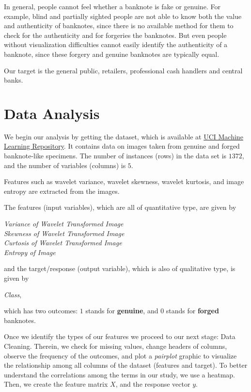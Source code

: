 \documentclass[a4paper,11pt]{amsart}
\begin{document}
\medbreak

In general, people cannot feel whether a banknote is fake or genuine. For example, 
blind and partially sighted people are not able to know both the value and authenticity of banknotes, since there is no available method for them to check for the authenticity and for forgeries the banknotes. But even people without visualization difficulties cannot easily identify the authenticity of a banknote, since these forgery and genuine banknotes are typically equal. 

\medbreak

Our target is the general public, retailers, professional cash handlers and central banks.

\section{Data Analysis}\label{dataanalysis}

We begin our analysis by getting the dataset, which is available at \href{https://archive.ics.uci.edu/ml/datasets/banknote+authentication}{UCI Machine Learning Repository}. It contains data on images taken from genuine and forged banknote-like specimens. The number of instances (rows) in the data set is $1372$, and the number of variables (columns) is $5$.

Features such as wavelet variance, wavelet skewness, wavelet kurtosis, and image entropy are extracted from the images.

\medbreak

The features (input variables), which are all of quantitative type, are given by
\begin{flushleft}
\emph{Variance of Wavelet Transformed Image}\\    
\emph{Skewness of Wavelet Transformed Image}\\
\emph{Curtosis of Wavelet Transformed Image}\\
\emph{Entropy of Image}\\
\end{flushleft}
and the target/response (output variable), which is also of qualitative type, is given by
\begin{flushleft}
\emph{Class},
\end{flushleft}
which has two outcomes: $1$ stands for \textbf{genuine}, and $0$ stands for \textbf{forged} banknotes.  

\medbreak

Once we identify the types of our features we proceed to our next stage: Data Cleaning. Therein, we check for missing values, change headers of columns, observe the frequency of the outcomes, and plot a \emph{pairplot} graphic to visualize the relationship among all columns of the dataset (features and target). To better understand the correlations among the terms in our study, we use a heatmap. Then, we create the feature matrix $X$, and the response vector $y$. 
\end{document}
